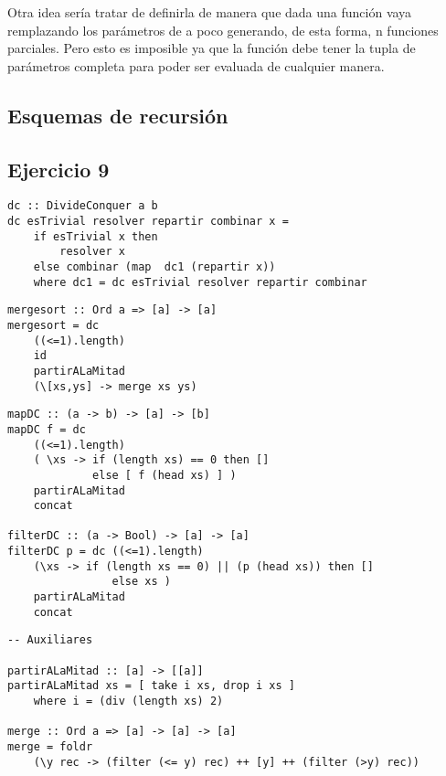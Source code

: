 Otra idea sería tratar de definirla de manera que dada una función vaya remplazando los parámetros de a poco generando, de esta forma, n funciones parciales. Pero esto es imposible ya que la función debe tener la tupla de parámetros completa para poder ser evaluada de cualquier manera.

\subsection*{Esquemas de recursión}
\subsection{Ejercicio 9}
\begin{centrado}
	\begin{verbatim}
dc :: DivideConquer a b
dc esTrivial resolver repartir combinar x = 
	if esTrivial x then 
		resolver x 
	else combinar (map  dc1 (repartir x))
	where dc1 = dc esTrivial resolver repartir combinar

\end{verbatim}
\end{centrado}

\begin{centrado}
	\begin{verbatim}
mergesort :: Ord a => [a] -> [a]
mergesort = dc
    ((<=1).length)
    id
    partirALaMitad
    (\[xs,ys] -> merge xs ys)	
	\end{verbatim}
\end{centrado}

\begin{centrado}
	\begin{verbatim}
mapDC :: (a -> b) -> [a] -> [b]
mapDC f = dc 
    ((<=1).length)
    ( \xs -> if (length xs) == 0 then [] 
	         else [ f (head xs) ] )
    partirALaMitad
    concat

filterDC :: (a -> Bool) -> [a] -> [a]
filterDC p = dc ((<=1).length)
	(\xs -> if (length xs == 0) || (p (head xs)) then []
		        else xs )
	partirALaMitad
	concat
	\end{verbatim}
\end{centrado}

\begin{centrado}
	\begin{verbatim}
-- Auxiliares

partirALaMitad :: [a] -> [[a]]
partirALaMitad xs = [ take i xs, drop i xs ] 
	where i = (div (length xs) 2)

merge :: Ord a => [a] -> [a] -> [a]
merge = foldr 
	(\y rec -> (filter (<= y) rec) ++ [y] ++ (filter (>y) rec))	 
	\end{verbatim}
\end{centrado}


